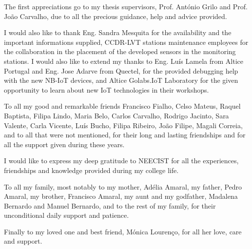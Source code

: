 
The first appreciations go to my thesis supervisors, Prof. António Grilo and Prof. João Carvalho, due to all the precious guidance, help and advice provided.

I would also like to thank Eng. Sandra Mesquita for the availability and the important informations supplied, CCDR-LVT stations maintenance employees for the collaboration in the placement of the developed sensors in the monitoring stations.
I would also like to extend my thanks to Eng. Luís Lamela from Altice Portugal and Eng. Jose Adarve from Quectel, for the provided debugging help with the new NB-IoT devices, and Altice Golabs.IoT Laboratory for the given opportunity to learn about new IoT technologies in their workshops.

To all my good and remarkable friends Francisco Fialho, Celso Mateus, Raquel Baptista, Filipa Lindo, Maria Belo, Carlos Carvalho, Rodrigo Jacinto, Sara Valente, Carla Vicente, Luís Bucho, Filipa Ribeiro, João Filipe, Magali Correia, and to all that were not mentioned, for their long and lasting friendships and for all the support given during these years.

I would like to express my deep gratitude to NEECIST for all the experiences, friendships and knowledge provided during my college life.

To all my family, most notably to my mother, Adélia Amaral, my father, Pedro Amaral, my brother, Francisco Amaral, my aunt and my godfather, Madalena Bernardo and Manuel Bernardo, and to the rest of my family, for their unconditional daily support and patience.

Finally to my loved one and best friend, Mónica Lourenço, for all her love, care and support.
